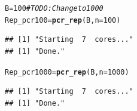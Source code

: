 \documentclass[11pt]{article}\usepackage[]{graphicx}\usepackage[]{color}
\makeatletter
\newcommand{\hlnum}[1]{\textcolor[rgb]{0.686,0.059,0.569}{#1}}%
\newcommand{\hlcom}[1]{\textcolor[rgb]{0.678,0.584,0.686}{\textit{#1}}}%
\newcommand{\hlstd}[1]{\textcolor[rgb]{0.345,0.345,0.345}{#1}}%
\newcommand{\hlkwb}[1]{\textcolor[rgb]{0.69,0.353,0.396}{#1}}%
\newcommand{\hlkwc}[1]{\textcolor[rgb]{0.333,0.667,0.333}{#1}}%
\newcommand{\hlkwd}[1]{\textcolor[rgb]{0.737,0.353,0.396}{\textbf{#1}}}%
\newenvironment{kframe}{%
 \def\at@end@of@kframe{}%
 \ifinner\ifhmode%
  \def\at@end@of@kframe{\end{minipage}}%
  \begin{minipage}{\columnwidth}%
 \fi\fi%
 \def\FrameCommand##1{\hskip\@totalleftmargin \hskip-\fboxsep
 \colorbox{shadecolor}{##1}\hskip-\fboxsep
     \hskip-\linewidth \hskip-\@totalleftmargin \hskip\columnwidth}%
 \MakeFramed {\advance\hsize-\width
   \@totalleftmargin\z@ \linewidth\hsize
   \@setminipage}}%
 {\par\unskip\endMakeFramed%
 \at@end@of@kframe}
\newenvironment{knitrout}{}{} %
\makeatother
\begin{document}
\begin{knitrout}
\begin{kframe}
\begin{alltt}
\hlstd{B} \hlkwb{=} \hlnum{100} \hlcom{# TODO: Change to 1000}
\hlstd{Rep_pcr100} \hlkwb{=} \hlkwd{pcr_rep}\hlstd{(B,}\hlkwc{n}\hlstd{=}\hlnum{100}\hlstd{)}
\end{alltt}
\begin{lstlisting}[basicstyle=\ttfamily,breaklines=true]
## [1] "Starting  7  cores..."
## [1] "Done."
\end{lstlisting}
\begin{alltt}
\hlstd{Rep_pcr1000} \hlkwb{=} \hlkwd{pcr_rep}\hlstd{(B,}\hlkwc{n}\hlstd{=}\hlnum{1000}\hlstd{)}
\end{alltt}
\begin{lstlisting}[basicstyle=\ttfamily,breaklines=true]
## [1] "Starting  7  cores..."
## [1] "Done."
\end{lstlisting}
\end{kframe}
\end{knitrout}
\end{document}
